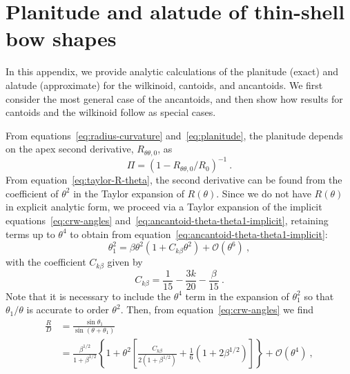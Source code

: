 
\section{Planitude and alatude of thin-shell bow shapes}
\label{sec:thin-shell-shapes}

In this appendix, we provide analytic calculations of the planitude
(exact) and alatude (approximate) for the wilkinoid, cantoids, and
ancantoids.  We first consider the most general case of the
ancantoids, and then show how results for cantoids and the wilkinoid
follow as special cases.

From equations~\eqref{eq:radius-curvature} and~\eqref{eq:planitude},
the planitude depends on the apex second derivative,
\(R_{\theta\theta,0}\), as
\begin{equation}
  \label{eq:planitude-from-2nd-derivative}
  \Pi = \left(  1 - R_{\theta\theta,0} / R_0\right)^{-1} \ .
\end{equation}
From equation~\eqref{eq:taylor-R-theta}, the second derivative can be
found from the coefficient of \(\theta^2\) in the Taylor expansion
of \(R(\theta)\).  Since we do not have \(R(\theta)\) in explicit analytic form,
we proceed via a Taylor expansion of the implicit
equations~\eqref{eq:crw-angles}
and~\eqref{eq:ancantoid-theta-theta1-implicit}, retaining terms up to
\(\theta^4\) to obtain from
equation~\eqref{eq:ancantoid-theta-theta1-implicit}:
\begin{equation}
  \label{eq:taylor-expansion-implicit}
  \theta_1^2 = \beta \theta^2 \left( 1 + C_{k\beta} \theta^2\right) + \mathcal{O}(\theta^6)\ , 
\end{equation}
with the coefficient \(C_{k\beta}\) given by
\begin{equation}
  \label{eq:C-k-beta}
  C_{k\beta} = \frac{1}{15} - \frac{3k}{20} - \frac{\beta}{15}  \ .
\end{equation}
Note that it is necessary to include the \(\theta^4\) term in the expansion
of \(\theta_1^2\) so that \(\theta_1/\theta\) is accurate to order
\(\theta^2\).  Then, from equation~\eqref{eq:crw-angles} we find
\begin{align}
  \label{eq:taylor-R-over-D}
  \frac{R}{D} & = \frac{\sin \theta_1} {\sin (\theta + \theta_1)} \nonumber \\
              & = \frac{\beta^{1/2}}{1+\beta^{1/2}}
                \left\lbrace 1 + \theta^2
                \left[ \frac{C_{k\beta}} {2 \left(1+\beta^{1/2}\right)}
                + \frac{1}{6} \left(1+2\beta^{1/2} \right)
                \right]
                \right\rbrace + \mathcal{O}(\theta^4) \ ,
\end{align}
